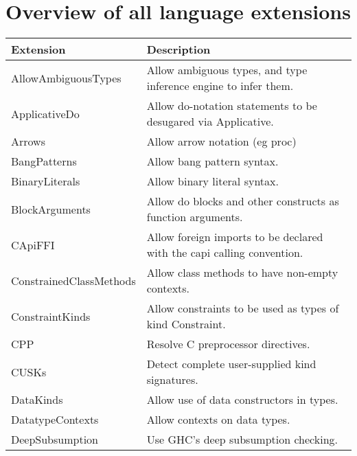 \documentclass[openany, 12pt]{book}
\begin{document}
\chapter{Overview of all language extensions}
\begin{center}
	\begin{supertabular}{ll}
		\toprule
		Extension                  & Description                                                                \\
		\midrule
		AllowAmbiguousTypes        & Allow ambiguous types, and type inference engine to infer them.            \\
		ApplicativeDo              & Allow do-notation statements to be desugared via Applicative.              \\
		Arrows                     & Allow arrow notation (eg proc)                                             \\
		BangPatterns               & Allow bang pattern syntax.                                                 \\
		BinaryLiterals             & Allow binary literal syntax.                                               \\
		BlockArguments             & Allow do blocks and other constructs as function arguments.                \\
		CApiFFI                    & Allow foreign imports to be declared with the capi calling convention.     \\
		ConstrainedClassMethods    & Allow class methods to have non-empty contexts.                            \\
		ConstraintKinds            & Allow constraints to be used as types of kind Constraint.                  \\
		CPP                        & Resolve C preprocessor directives.                                         \\
		CUSKs                      & Detect complete user-supplied kind signatures.                             \\
		DataKinds                  & Allow use of data constructors in types.                                   \\
		DatatypeContexts           & Allow contexts on data types.                                              \\
		DeepSubsumption            & Use GHC's deep subsumption checking.                                       \\

\end{supertabular}
\end{center}
\end{document}
